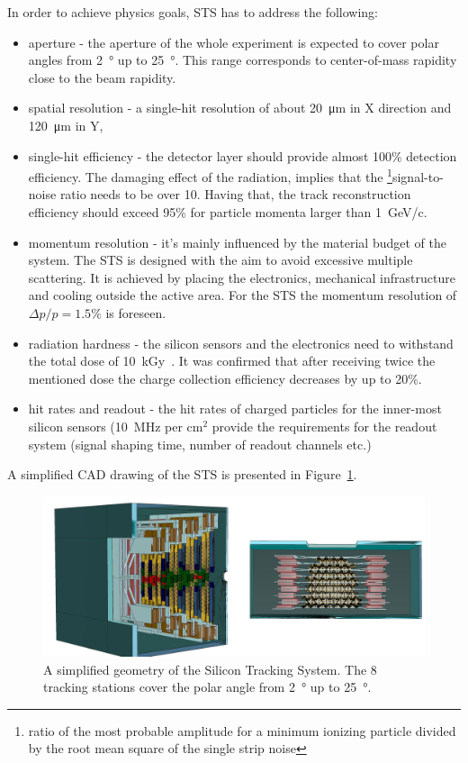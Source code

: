 In order to achieve physics goals, \gls{STS} has to address the following:
\begin{itemize}
    \item  aperture - the aperture of the whole experiment is expected to cover polar angles from \SI{2}{\degree} up to \SI{25}{\degree}. This range corresponds to center-of-mass rapidity close to the beam rapidity. 
    \item spatial resolution - a single-hit resolution of about \SI{20}{\micro\metre} in X direction and \SI{120}{\micro\metre} in Y, 
    \item single-hit efficiency - the detector layer should provide almost 100\% detection efficiency. The damaging effect of the radiation, implies that the \footnote{ratio of the most probable amplitude for a minimum ionizing particle divided by the root mean square of the single strip noise}{signal-to-noise} ratio needs to be over 10. Having that, the track reconstruction efficiency should exceed 95\% for particle momenta larger than 1~GeV/c. 
    \item momentum resolution - it's mainly influenced by the material budget of the system. The \gls{STS} is designed with the aim to avoid excessive multiple scattering. It is achieved by placing the electronics, mechanical infrastructure and cooling outside the active area. For the \gls{STS} the momentum resolution of $\Delta p/p = 1.5\%$ is foreseen. 
    \item radiation hardness - the silicon sensors and the electronics need to withstand the total dose of 10~kGy~\cite{Heuser:54798}. It was confirmed that after receiving twice the mentioned dose the charge collection efficiency decreases by up to 20\%. 
    \item hit rates and readout - the hit rates of charged particles for the inner-most silicon sensors (10~MHz per $\mathrm{cm^{2}}$ provide the requirements for the readout system (signal shaping time, number of readout channels etc.)
\end{itemize}

A simplified CAD drawing of the \gls{STS} is presented in Figure~\ref{fig_STS}. 

\begin{figure}[!h]
\centering
\includegraphics[width=0.85\columnwidth]{Chapter2/images/STS.png}
\caption{A simplified geometry of the Silicon Tracking System. The 8 tracking stations cover the polar angle from \SI{2}{\degree} up to \SI{25}{\degree}.}
\label{fig_STS}
\end{figure}

